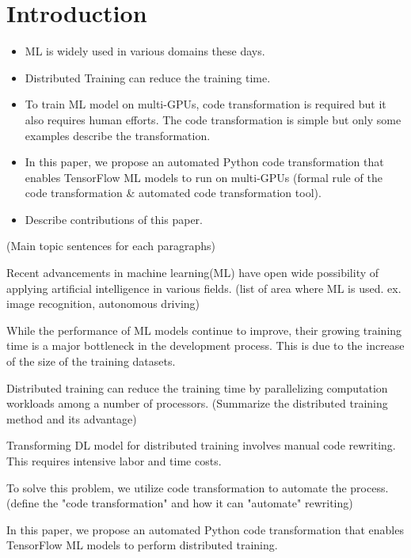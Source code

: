 \section{Introduction}\label{sec:intro}
\begin{itemize}
  \item ML is widely used in various domains these days.
  \item Distributed Training can reduce the training time.
  \item To train ML model on multi-GPUs, code transformation is required but it
    also requires human efforts. The code transformation is simple but only
    some examples describe the transformation.
  \item In this paper, we propose an automated Python code transformation that
    enables TensorFlow ML models to run on multi-GPUs (formal rule of the code
    transformation \& automated code transformation tool).
  \item Describe contributions of this paper.
\end{itemize}

(Main topic sentences for each paragraphs)

Recent advancements in machine learning(ML) have open wide possibility of
applying artificial intelligence in various fields.
(list of area where ML is used. ex. image recognition, autonomous driving)

While the performance of ML models continue to improve,
their growing training time is a major bottleneck in the development process.
This is due to the increase of the size of the training datasets.

Distributed training can reduce the training time 
by parallelizing computation workloads among a number of processors.
(Summarize the distributed training method and its advantage)

Transforming DL model for distributed training involves
manual code rewriting. This requires intensive labor and time costs.

To solve this problem, we utilize code transformation to automate the process.
(define the "code transformation" and how it can "automate" rewriting)

In this paper, we propose an automated Python code transformation that enables
TensorFlow ML models to perform distributed training.

